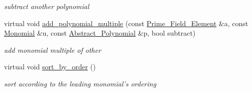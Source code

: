 \begin{Indent}
\begin{DoxyCompactItemize}
\begin{DoxyCompactList}\small\item\em subtract another polynomial \end{DoxyCompactList}\item 
\mbox{\label{class_double___buffered___polynomial_a2c378eabf8bbbfd15492fc8f4541428a}} 
virtual void \hyperlink{class_double___buffered___polynomial_a2c378eabf8bbbfd15492fc8f4541428a}{add\+\_\+polynomial\+\_\+multiple} (const \hyperlink{class_prime___field___element}{Prime\+\_\+\+Field\+\_\+\+Element} \&a, const \hyperlink{class_monomial}{Monomial} \&u, const \hyperlink{class_abstract___polynomial}{Abstract\+\_\+\+Polynomial} \&p, bool subtract)
\begin{DoxyCompactList}\small\item\em add monomial multiple of other \end{DoxyCompactList}\item 
virtual void \hyperlink{class_double___buffered___polynomial_a0e7acad01d5ade31b60fe5453d48fdb5}{sort\+\_\+by\+\_\+order} ()
\begin{DoxyCompactList}\small\item\em sort according to the leading monomial's ordering \end{DoxyCompactList}\end{DoxyCompactItemize}
\end{Indent}
